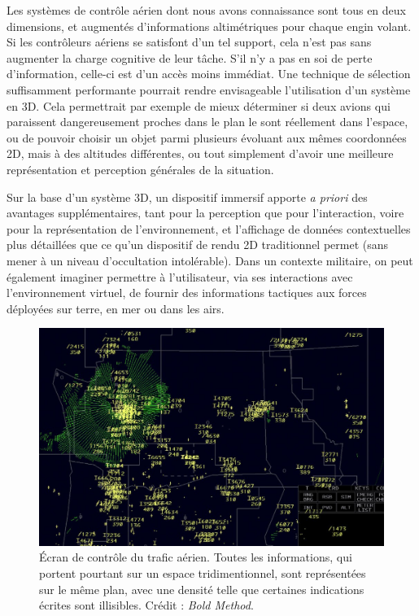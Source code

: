 	Les systèmes de contrôle aérien dont nous avons connaissance sont tous en deux dimensions, et augmentés d'informations altimétriques pour chaque engin volant. Si les contrôleurs aériens se satisfont d'un tel support, cela n'est pas sans augmenter la charge cognitive de leur tâche. S'il n'y a pas en soi de perte d'information, celle-ci est d'un accès moins immédiat. Une technique de sélection suffisamment performante pourrait rendre envisageable l'utilisation d'un système en 3D. Cela permettrait par exemple de mieux déterminer si deux avions qui paraissent dangereusement proches dans le plan le sont réellement dans l'espace, ou de pouvoir choisir un objet parmi plusieurs évoluant aux mêmes coordonnées 2D, mais à des altitudes différentes, ou tout simplement d'avoir une meilleure représentation et perception générales de la situation.
	
	Sur la base d'un système 3D, un dispositif immersif apporte \emph{a priori} des avantages supplémentaires, tant pour la perception que pour l'interaction, voire pour la représentation de l'environnement, et l'affichage de données contextuelles plus détaillées que ce qu'un dispositif de rendu 2D traditionnel permet (sans mener à un niveau d'occultation intolérable). Dans un contexte militaire, on peut également imaginer permettre à l'utilisateur, via ses interactions avec l'environnement virtuel, de fournir des informations tactiques aux forces déployées sur terre, en mer ou dans les airs.

	\begin{figure}[!htbp]
		\centering
		\includegraphics[width=\textwidth]{figures/ch1/Radar-Scope-ZSE}
		\caption[Écran de contrôle du trafic aérien, en 2D]{Écran de contrôle du trafic aérien. Toutes les informations, qui portent pourtant sur un espace tridimentionnel, sont représentées sur le même plan, avec une densité telle que certaines indications écrites sont illisibles. Crédit : \emph{Bold Method}.}
		\label{fig:airtraffic}
	\end{figure}
	
